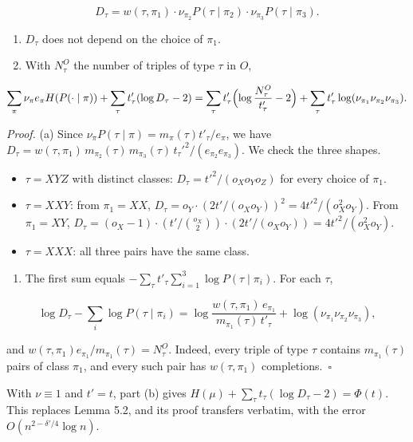\documentclass[english,11pt,a4paper]{article}
\providecommand{\tightlist}{\setlength{\itemsep}{0pt}\setlength{\parskip}{0pt}}
\begin{document}
\nopagebreak[4]
\[D_\tau=w(\tau,\pi_1)\cdot\nu_{\pi_2}P(\tau\mid\pi_2)\cdot\nu_{\pi_3}P(\tau\mid\pi_3).\]

\begin{enumerate}
\def\labelenumi{(\alph{enumi})}
\item
  \(D_\tau\) does not depend on the choice of \(\pi_1\).
\item
  With \(N^O_\tau\) the number of triples of type \(\tau\) in \(O\),
\end{enumerate}

\nopagebreak[4]
\[\sum_\pi\nu_\pi e_\pi H(P(\cdot\mid\pi))+\sum_\tau t'_\tau(\log D_\tau-2)
=\sum_\tau t'_\tau\Bigl(\log\frac{N^O_\tau}{t'_\tau}-2\Bigr)+\sum_\tau t'_\tau\log(\nu_{\pi_1}\nu_{\pi_2}\nu_{\pi_3}).\]

\emph{Proof.} (a) Since \(\nu_\pi P(\tau\mid\pi)=m_\pi(\tau)t'_\tau/e_\pi\), we have \(D_\tau=w(\tau,\pi_1)\,m_{\pi_2}(\tau)\,m_{\pi_3}(\tau)\,t_\tau'^2/(e_{\pi_2}e_{\pi_3})\). We check the three shapes.

\begin{itemize}
\tightlist
\item
  \(\tau=XYZ\) with distinct classes: \(D_\tau=t'^2/(o_Xo_Yo_Z)\) for every choice of \(\pi_1\).
\item
  \(\tau=XXY\): from \(\pi_1=XX\), \(D_\tau=o_Y\cdot(2t'/(o_Xo_Y))^2=4t'^2/(o_X^2o_Y)\). From \(\pi_1=XY\), \(D_\tau=(o_X-1)\cdot(t'/\binom{o_X}{2})\cdot(2t'/(o_Xo_Y))=4t'^2/(o_X^2o_Y)\).
\item
  \(\tau=XXX\): all three pairs have the same class.
\end{itemize}

\begin{enumerate}
\def\labelenumi{(\alph{enumi})}
\setcounter{enumi}{1}
\tightlist
\item
  The first sum equals \(-\sum_\tau t'_\tau\sum_{i=1}^{3}\log P(\tau\mid\pi_i)\). For each \(\tau\),
\end{enumerate}

\nopagebreak[4]
\[\log D_\tau-\sum_i\log P(\tau\mid\pi_i)=\log\frac{w(\tau,\pi_1)\,e_{\pi_1}}{m_{\pi_1}(\tau)\,t'_\tau}+\log(\nu_{\pi_1}\nu_{\pi_2}\nu_{\pi_3}),\]

and \(w(\tau,\pi_1)e_{\pi_1}/m_{\pi_1}(\tau)=N^O_\tau\). Indeed, every triple of type \(\tau\) contains \(m_{\pi_1}(\tau)\) pairs of class \(\pi_1\), and every such pair has \(w(\tau,\pi_1)\) completions.~\(\square\)

With \(\nu\equiv1\) and \(t'=t\), part (b) gives \(H(\mu)+\sum_\tau t_\tau(\log D_\tau-2)=\Phi(t)\). This replaces Lemma 5.2, and its proof transfers verbatim, with the error \(O(n^{2-\delta'/4}\log n)\).
\end{document}
